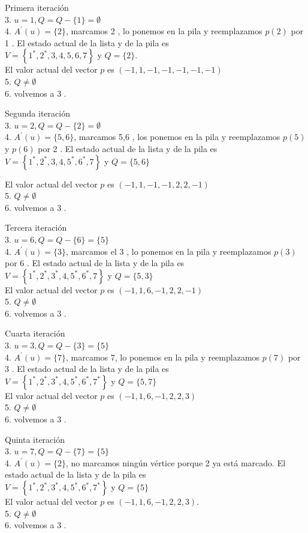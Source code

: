 \documentclass[10pt]{article}
\begin{document}
Primera iteración\\
3. $u=1, Q=Q-\{1\}=\emptyset$\\
4. $A^{\prime}(u)=\{2\}$, marcamos 2 , lo ponemos en la pila y reemplazamos $p(2)$ por 1 . El estado actual de la lista y de la pila es\\
$V=\left\{1^{*}, 2^{*}, 3,4,5,6,7\right\}$ y $Q=\{2\}$.\\
El valor actual del vector $p$ es $(-1,1,-1,-1,-1,-1,-1)$\\
5. $Q \neq \emptyset$\\
6. volvemos a 3 .

Segunda iteración\\
3. $u=2, Q=Q-\{2\}=\emptyset$\\
4. $A^{\prime}(u)=\{5,6\}$, marcamos 5,6 , los ponemos en la pila y reemplazamos $p(5)$ y $p(6)$ por 2 . El estado actual de la lista y de la pila es\\
$V=\left\{1^{*}, 2^{*}, 3,4,5^{*}, 6^{*}, 7\right\}$ y $Q=\{5,6\}$

El valor actual del vector $p$ es $(-1,1,-1,-1,2,2,-1)$\\
5. $Q \neq \emptyset$\\
6. volvemos a 3 .

Tercera iteración\\
3. $u=6, Q=Q-\{6\}=\{5\}$\\
4. $A^{\prime}(u)=\{3\}$, marcamos el 3 , lo ponemos en la pila y reemplazamos $p(3)$ por 6 . El estado actual de la lista y de la pila es\\
$V=\left\{1^{*}, 2^{*}, 3^{*}, 4,5^{*}, 6^{*}, 7\right\}$ y $Q=\{5,3\}$\\
El valor actual del vector $p$ es $(-1,1,6,-1,2,2,-1)$\\
5. $Q \neq \emptyset$\\
6. volvemos a 3 .

Cuarta iteración\\
3. $u=3, Q=Q-\{3\}=\{5\}$\\
4. $A^{\prime}(u)=\{7\}$, marcamos 7, lo ponemos en la pila y reemplazamos $p(7)$ por 3 . El estado actual de la lista y de la pila es\\
$V=\left\{1^{*}, 2^{*}, 3^{*}, 4,5^{*}, 6^{*}, 7^{*}\right\}$ y $Q=\{5,7\}$\\
El valor actual del vector $p$ es $(-1,1,6,-1,2,2,3)$\\
5. $Q \neq \emptyset$\\
6. volvemos a 3 .

Quinta iteración\\
3. $u=7, Q=Q-\{7\}=\{5\}$\\
4. $A^{\prime}(u)=\{2\}$, no marcamos ningún vértice porque 2 ya está marcado. El estado actual de la lista y de la pila es\\
$V=\left\{1^{*}, 2^{*}, 3^{*}, 4,5^{*}, 6^{*}, 7^{*}\right\}$ y $Q=\{5\}$\\
El valor actual del vector $p$ es $(-1,1,6,-1,2,2,3)$.\\
5. $Q \neq \emptyset$\\
6. volvemos a 3 .
\end{document}
